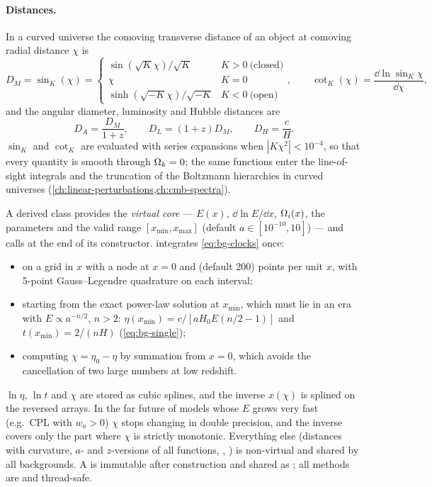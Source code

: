\paragraph*{Distances.} In a curved universe the comoving transverse distance of an object at comoving radial
distance $\chi$ is
\begin{equation}
D_M=\sin_K(\chi)=\begin{cases}\sin(\sqrt K\chi)/\sqrt K & K>0\ \text{(closed)}\\ \chi & K=0\\
\sinh(\sqrt{-K}\chi)/\sqrt{-K} & K<0\ \text{(open)}\end{cases},\qquad
\cot_K(\chi)=\frac{\dd\ln\sin_K\chi}{\dd\chi},
\label{eq:bg-sinK}
\end{equation}
and the angular diameter, luminosity and Hubble distances are
\begin{equation}
D_A=\frac{D_M}{1+z},\qquad D_L=(1+z)D_M,\qquad D_H=\frac{c}{H}.
\end{equation}
$\sin_K$ and $\cot_K$ are evaluated with series expansions when $|K\chi^2|<10^{-4}$, so that every quantity is
smooth through $\Omega_k=0$; the same functions enter the line-of-sight integrals and the truncation of the Boltzmann
hierarchies in curved universes (\cref{ch:linear-perturbations,ch:cmb-spectra}).

\begin{implementation}
A derived class provides the \emph{virtual core} --- $E(x)$, $\dd\ln E/\dd x$, $\Omega_i(x)$, the parameters and the
valid range $[x_{\min},x_{\max}]$ (default $a\in[10^{-10},10]$) --- and calls  at the end of its
constructor.  integrates \cref{eq:bg-clocks} once:
\begin{itemize}
\item on a grid in $x$ with a node at $x=0$ and  (default 200) points per unit $x$, with
      5-point Gauss--Legendre quadrature on each interval;
\item starting from the exact power-law solution at $x_{\min}$, which must lie in an era with $E\propto a^{-n/2}$,
      $n>2$: $\eta(x_{\min})=c/[aH_0E(n/2-1)]$ and $t(x_{\min})=2/(nH)$ (\cref{eq:bg-single});
\item computing $\chi=\eta_0-\eta$ by summation from $x=0$, which avoids the cancellation of two large numbers at
      low redshift.
\end{itemize}
$\ln\eta$, $\ln t$ and $\chi$ are stored as cubic splines, and the inverse $x(\chi)$ is splined on the reversed
arrays. In the far future of models whose $E$ grows very fast (e.g.\ CPL with $w_a>0$) $\chi$ stops changing in
double precision, and the inverse covers only the part where $\chi$ is strictly monotonic. Everything else
(distances with curvature, $a$- and $z$-versions of all functions, , ) is non-virtual and
shared by all backgrounds. A  is immutable after construction and shared as
; all methods are  and thread-safe.
\end{implementation}

